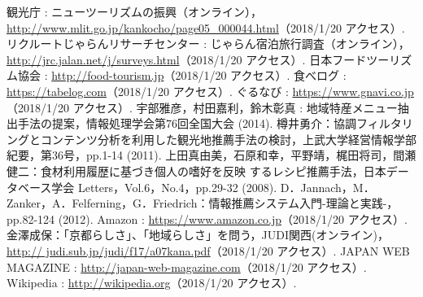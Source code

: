 \documentclass{funthesis}
\begin{document}
\begin{thebibliography}{99}
 観光庁 : ニューツーリズムの振興（オンライン），\url{http://www.mlit.go.jp/kankocho/page05_000044.html}（2018/1/20 アクセス）.
 リクルートじゃらんリサーチセンター : じゃらん宿泊旅行調査（オンライン），\url{http://jrc.jalan.net/j/surveys.html}（2018/1/20 アクセス）.
 日本フードツーリズム協会 : \url{http://food-tourism.jp}（2018/1/20 アクセス）.
 食べログ : \url{https://tabelog.com}（2018/1/20 アクセス）.
 ぐるなび : \url{https://www.gnavi.co.jp}（2018/1/20 アクセス）.
 宇部雅彦，村田嘉利，鈴木彰真 : 地域特産メニュー抽出手法の提案，情報処理学会第76回全国大会 (2014).
 樽井勇介：協調フィルタリングとコンテンツ分析を利用した観光地推薦手法の検討，上武大学経営情報学部紀要，第36号，pp.1-14 (2011).
 上田真由美，石原和幸，平野靖，梶田将司，間瀬 健二：食材利用履歴に基づき個人の嗜好を反映 するレシピ推薦手法，日本データベース学会 Letters，Vol.6，No.4，pp.29-32 (2008).
 D．Jannach，M．Zanker，A．Felferning，G．Friedrich：情報推薦システム入門-理論と実践-，pp.82-124 (2012).
 Amazon : \url{https://www.amazon.co.jp}（2018/1/20 アクセス）.
 金澤成保：「京都らしさ」、「地域らしさ」を問う，JUDI関西(オンライン)，\url{http:// judi.sub.jp/judi/f17/a07kana.pdf}（2018/1/20 アクセス）.
 JAPAN WEB MAGAZINE : \url{http://japan-web-magazine.com}（2018/1/20 アクセス）.
 Wikipedia : \url{http://wikipedia.org}（2018/1/20 アクセス）.
\end{thebibliography}

\listoftables

\listoffigures
\end{document}
